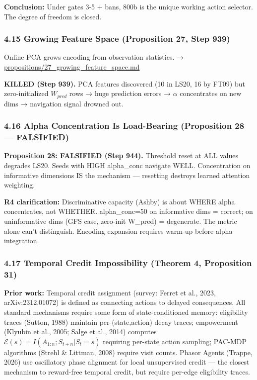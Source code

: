 \documentclass[
  11pt,
]{article}
\begin{document}
\textbf{Conclusion:} Under gates 3-5 + bans, 800b is the unique working
action selector. The degree of freedom is closed.

\subsubsection{4.15 Growing Feature Space (Proposition 27, Step
939)}\label{growing-feature-space-proposition-27-step-939}

Online PCA grows encoding from observation statistics. →
\url{propositions/27_growing_feature_space.md}

\textbf{KILLED (Step 939).} PCA features discovered (10 in LS20, 16 by
FT09) but zero-initialized \(W_{pred}\) rows → huge prediction errors →
\(\alpha\) concentrates on new dims → navigation signal drowned out.

\subsubsection{4.16 Alpha Concentration Is Load-Bearing (Proposition 28
---
FALSIFIED)}\label{alpha-concentration-is-load-bearing-proposition-28-falsified}

\textbf{Proposition 28: FALSIFIED (Step 944).} Threshold reset at ALL
values degrades LS20. Seeds with HIGH alpha\_conc navigate WELL.
Concentration on informative dimensions IS the mechanism --- resetting
destroys learned attention weighting.

\textbf{R4 clarification:} Discriminative capacity (Ashby) is about
WHERE alpha concentrates, not WHETHER. alpha\_conc=50 on informative
dims = correct; on uninformative dims (GFS case, zero-init W\_pred) =
degenerate. The metric alone can't distinguish. Encoding expansion
requires warm-up before alpha integration.

\subsubsection{4.17 Temporal Credit Impossibility (Theorem 4,
Proposition
31)}\label{temporal-credit-impossibility-theorem-4-proposition-31}

\textbf{Prior work:} Temporal credit assignment (survey: Ferret et al.,
2023, arXiv:2312.01072) is defined as connecting actions to delayed
consequences. All standard mechanisms require some form of
state-conditioned memory: eligibility traces (Sutton, 1988) maintain
per-(state,action) decay traces; empowerment (Klyubin et al., 2005;
Salge et al., 2014) computes
\(\mathcal{E}(s) = I(A_{1:n}; S_{t+n} | S_t = s)\) requiring per-state
action sampling; PAC-MDP algorithms (Strehl \& Littman, 2008) require
visit counts. Phasor Agents (Trappe, 2026) use oscillatory phase
alignment for local unsupervised credit --- the closest mechanism to
reward-free temporal credit, but require per-edge eligibility traces.
\end{document}
